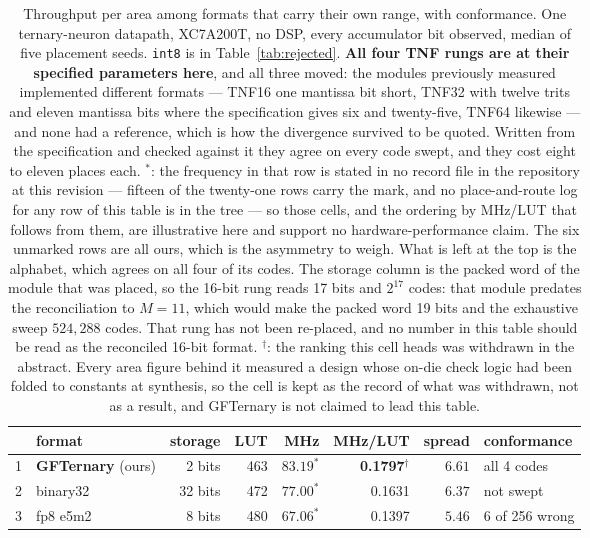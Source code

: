 \documentclass[11pt]{article}
\theoremstyle{definition}
\begin{document}
\begin{table}[t]\centering
\caption{Throughput per area among formats that carry their own range, with
conformance. One ternary-neuron datapath, XC7A200T, no DSP, every accumulator
bit observed, median of five placement seeds. \texttt{int8} is in
Table~\ref{tab:rejected}. \textbf{All four TNF rungs are at their specified
parameters here}, and all three moved: the modules previously measured
implemented different formats --- TNF16 one mantissa bit short, TNF32 with twelve
trits and eleven mantissa bits where the specification gives six and
twenty-five, TNF64 likewise --- and none had a reference, which is how the
divergence survived to be quoted. Written from the specification and checked
against it they agree on every code swept, and they cost eight to eleven places
each. $^{\ast}$: the frequency in that row is stated in no record file in the
repository at this revision --- fifteen of the twenty-one rows carry the mark, and
no place-and-route log for any row of this table is in the tree --- so those cells,
and the ordering by MHz/LUT that follows from them, are illustrative here and
support no hardware-performance claim. The six unmarked rows are all ours, which
is the asymmetry to weigh. What is left at the top is the alphabet, which agrees on all four of its
codes. The storage column is the packed word of the module that was placed, so the
16-bit rung reads 17 bits and $2^{17}$ codes: that module predates the
reconciliation to $M = 11$, which would make the packed word 19 bits and the
exhaustive sweep $524{,}288$ codes. That rung has not been re-placed, and no
number in this table should be read as the reconciled 16-bit format.
$^{\dagger}$: the ranking this cell heads was withdrawn in the abstract. Every
area figure behind it measured a design whose on-die check logic had been folded
to constants at synthesis, so the cell is kept as the record of what was
withdrawn, not as a result, and GFTernary is not claimed to lead this table.}
\label{tab:fullthroughput}
\small\setlength{\tabcolsep}{4pt}
\begin{tabular}{rlrrrrrl}
\toprule
& format & storage & LUT & MHz & MHz/LUT & spread & conformance \\
\midrule
1 & \textbf{GFTernary} (ours) & 2 bits & 463 & $83.19^{\ast}$ & \textbf{0.1797}$^{\dagger}$ & $6.61$ & all 4 codes \\
2 & binary32 & 32 bits & 472 & $77.00^{\ast}$ & 0.1631 & $6.37$ & not swept \\
3 & fp8 e5m2 & 8 bits & 480 & $67.06^{\ast}$ & 0.1397 & $5.46$ & 6 of 256 wrong \\

\end{tabular}
\end{table}
\end{document}
